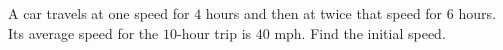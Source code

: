 A car travels at one speed for $4$ hours and then at twice that speed for $6$ hours. Its average speed for the $10$-hour trip is $40$ mph. Find the initial speed.
